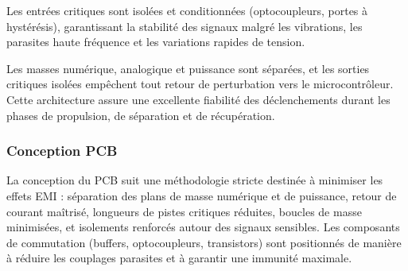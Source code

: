 Les entrées critiques sont isolées et conditionnées (optocoupleurs, portes à hystérésis), garantissant la stabilité des signaux
malgré les vibrations, les parasites haute fréquence et les variations rapides de tension.

Les masses numérique, analogique et puissance sont séparées, et les sorties critiques isolées empêchent tout retour de
perturbation vers le microcontrôleur. Cette architecture assure une excellente fiabilité des déclenchements durant les phases
de propulsion, de séparation et de récupération.

\subsubsection{Conception PCB}

La conception du PCB suit une méthodologie stricte destinée à minimiser les effets EMI : séparation des plans de masse numérique
et de puissance, retour de courant maîtrisé, longueurs de pistes critiques réduites, boucles de masse minimisées, et isolements
renforcés autour des signaux sensibles. Les composants de commutation (buffers, optocoupleurs, transistors) sont positionnés de
manière à réduire les couplages parasites et à garantir une immunité maximale.


